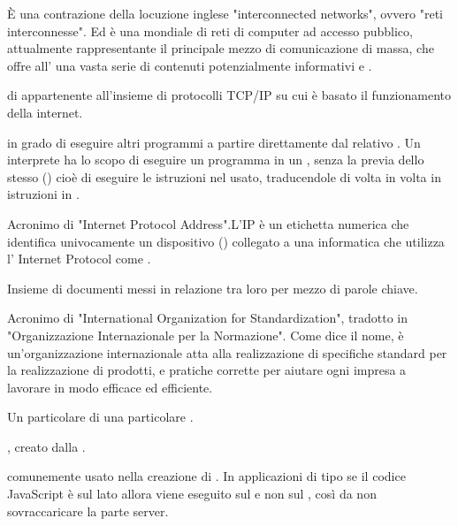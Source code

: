 {\`{E} una contrazione della locuzione inglese "interconnected networks", ovvero "reti interconnesse".
 Ed è una  mondiale di reti di computer ad accesso pubblico, attualmente rappresentante il principale mezzo di comunicazione di massa, che offre all' una vasta serie di contenuti potenzialmente informativi e .}


{ di  appartenente all'insieme di protocolli  TCP/IP su cui è basato il funzionamento della  internet.}



{ in grado di eseguire altri programmi a partire direttamente dal relativo . Un interprete ha lo scopo di eseguire un programma in un , senza la previa  dello stesso () cioè di eseguire le istruzioni nel  usato, traducendole di volta in volta in istruzioni in .}

{Acronimo di "Internet Protocol Address".L'IP è un etichetta numerica che identifica univocamente un dispositivo () collegato a una  informatica che utilizza l' Internet Protocol come .}


{Insieme di documenti messi in relazione tra loro per mezzo di parole chiave.} 


{Acronimo di "International Organization for Standardization", tradotto in "Organizzazione Internazionale per la Normazione". Come dice il nome, è un'organizzazione internazionale atta alla realizzazione di specifiche standard per la realizzazione di prodotti,  e pratiche corrette per aiutare ogni impresa a lavorare in modo efficace ed efficiente.}


{Un particolare  di una particolare .}





{ , creato dalla .}

{ comunemente usato nella creazione di . In applicazioni di tipo  se il codice JavaScript è sul lato  allora viene eseguito sul  e non sul , così da non sovraccaricare la parte server.}


